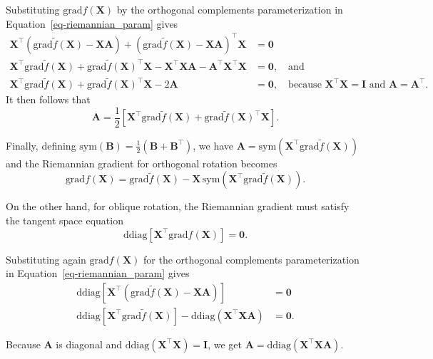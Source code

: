 \documentclass[
  12pt,
  letterpaper,
  article]{scrartcl}
\begin{document}
Substituting \(\text{grad}f(\mathbf{X})\) by the orthogonal complements
parameterization in Equation~\ref{eq-riemannian_param} gives \[
\begin{aligned}
\mathbf{X}^\top
\left(
\text{grad}\tilde{f}(\mathbf{X})
-
\mathbf{X}\mathbf{A}
\right)
+
\left(
\text{grad}\tilde{f}(\mathbf{X})
-
\mathbf{X}\mathbf{A}
\right)^\top
\mathbf{X}
&= \mathbf{0}
\\
\mathbf{X}^\top
\text{grad}\tilde{f}(\mathbf{X})
+
\text{grad}\tilde{f}(\mathbf{X})^\top
\mathbf{X}
-
\mathbf{X}^\top\mathbf{X}\mathbf{A}
-
\mathbf{A}^\top\mathbf{X}^\top\mathbf{X}
&= \mathbf{0}, \quad \text{and}
\\
\mathbf{X}^\top
\text{grad}\tilde{f}(\mathbf{X})
+
\text{grad}\tilde{f}(\mathbf{X})^\top
\mathbf{X}
-
2\mathbf{A}
&= \mathbf{0}, \quad \text{because } \mathbf{X}^\top\mathbf{X}=\mathbf{I} \text{ and } \mathbf{A}=\mathbf{A}^\top.
\end{aligned}
\] It then follows that \[
\mathbf{A}
=
\frac{1}{2}
\left[
\mathbf{X}^\top
\text{grad}\tilde{f}(\mathbf{X})
+
\text{grad}\tilde{f}(\mathbf{X})^\top
\mathbf{X}
\right].
\]

Finally, defining
\(\mathrm{sym}(\mathbf{B})=\frac{1}{2}\left(\mathbf{B}+\mathbf{B}^\top\right)\),
we have
\(\mathbf{A}=\mathrm{sym}\left(\mathbf{X}^\top\text{grad}\tilde{f}(\mathbf{X})\right)\)
and the Riemannian gradient for orthogonal rotation becomes \[
\text{grad}f(\mathbf{X}) = \text{grad}\tilde{f}(\mathbf{X}) -
\mathbf{X}\, \mathrm{sym}\left(\mathbf{X}^\top \text{grad}\tilde{f}(\mathbf{X}) \right).
\]

On the other hand, for oblique rotation, the Riemannian gradient must
satisfy the tangent space equation \[
\mathrm{ddiag}
\left[
\mathbf{X}^\top
\text{grad}f(\mathbf{X})
\right]
=
\mathbf{0}.
\]

Substituting again \(\text{grad}f(\mathbf{X})\) for the orthogonal
complements parameterization in Equation~\ref{eq-riemannian_param} gives
\[
\begin{aligned}
\mathrm{ddiag}
\left[
\mathbf{X}^\top
\left(
\text{grad}\tilde{f}(\mathbf{X})
-
\mathbf{X}\mathbf{A}
\right)
\right]
&= \mathbf{0}
\\
\mathrm{ddiag}
\left[
\mathbf{X}^\top
\text{grad}\tilde{f}(\mathbf{X})
\right]
-
\mathrm{ddiag}
\left(
\mathbf{X}^\top
\mathbf{X}\mathbf{A}
\right)
&= \mathbf{0}.
\end{aligned}
\]

Because \(\mathbf{A}\) is diagonal and
\(\mathrm{ddiag}\left(\mathbf{X}^\top\mathbf{X}\right)=\mathbf{I}\), we
get
\(\mathbf{A} = \mathrm{ddiag}\left(\mathbf{X}^\top\mathbf{X}\mathbf{A}\right)\).
\end{document}
